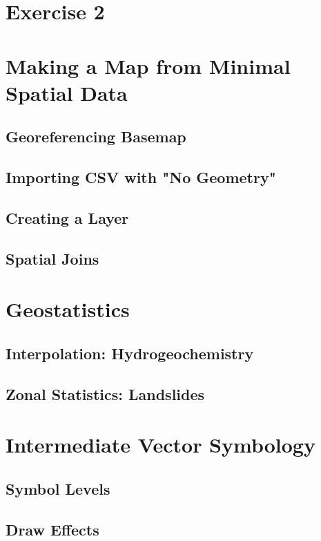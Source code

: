 \documentclass{article}
\begin{document}
\section{Exercise 2}

\section{Making a Map from Minimal Spatial Data}

\subsection{Georeferencing Basemap}

\subsection{Importing CSV with "No Geometry"}

\subsection{Creating a Layer}

\subsection{Spatial Joins}

\section{Geostatistics}

\subsection{Interpolation: Hydrogeochemistry}

\subsection{Zonal Statistics: Landslides}

\section{Intermediate Vector Symbology}

\subsection{Symbol Levels}

\subsection{Draw Effects}
\end{document}
